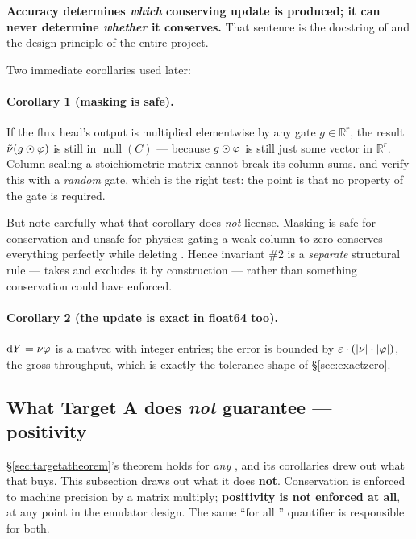 \textbf{Accuracy determines \emph{which} conserving update is produced; it can
never determine \emph{whether} it conserves.} That sentence is the docstring of
 and the design principle of the entire
project.

Two immediate corollaries used later:

\paragraph{Corollary 1 (masking is safe).} If the flux head's output is
multiplied elementwise by any gate $g \in \mathbb{R}^r$, the result
$\tilde\nu(g \odot \varphi)$ is still in $\operatorname{null}(C)$ --- because
$g \odot \varphi$ is still just some vector in $\mathbb{R}^r$. Column-scaling a
stoichiometric matrix cannot break its column sums.
 and
 verify this with a
\emph{random} gate, which is the right test: the point is that no property of
the gate is required.

But note carefully what that corollary does \emph{not} license. Masking is safe
for conservation and unsafe for physics: gating a weak column to zero conserves
everything perfectly while deleting \dYe. Hence invariant \#2 is a
\emph{separate} structural rule ---  takes
 and excludes it by construction --- rather than something
conservation could have enforced.

\paragraph{Corollary 2 (the update is exact in float64 too).}
$\mathrm{d} Y = \nu\varphi$ is a matvec with integer entries; the error is bounded by
$\varepsilon\cdot(|\nu|\cdot|\varphi|)$, the gross throughput, which is exactly
the tolerance shape of \S\ref{sec:exactzero}.

\subsection{What Target A does \emph{not} guarantee --- positivity}
\label{sec:positivity}

\S\ref{sec:targetatheorem}'s theorem holds for \emph{any} \netflux, and its
corollaries drew out what that buys. This subsection draws out what it does
\textbf{not}. Conservation is enforced to machine precision by a matrix
multiply; \textbf{positivity is not enforced at all}, at any point in the
emulator design. The same ``for all \netflux'' quantifier is responsible for
both.

